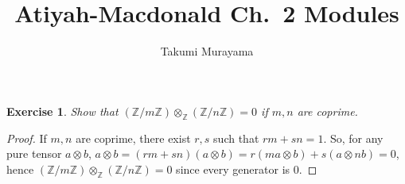 \documentclass[12pt,letterpaper]{article}
\title{Atiyah-Macdonald Ch.~2 Modules}
\author{Takumi Murayama}
\newtheorem{problem}{Exercise}[section]
\theoremstyle{definition}
\theoremstyle{remark}
\newtheorem*{remark}{Remark}
\numberwithin{figure}{problem}
\numberwithin{equation}{section}
\begin{document}
\maketitle \setcounter{section}{2}
\begin{problem}
  Show that
  $(\mathbb{Z}/m\mathbb{Z}) \otimes_{\mathbb{Z}} (\mathbb{Z}/n\mathbb{Z}) =
  0$ if
  $m,n$ are coprime.
\end{problem}
%
\begin{proof}
  If
  $m,n$ are coprime, there exist
  $r,s$ such that
  $rm + sn =
  1$.
  So, for any pure tensor
  $a \otimes
  b$,
  $a \otimes b = (rm + sn)(a \otimes b) = r(ma \otimes b) + s(a \otimes nb) =
  0$, hence
  $(\mathbb{Z}/m\mathbb{Z}) \otimes_{\mathbb{Z}} (\mathbb{Z}/n\mathbb{Z}) =
  0$ since every generator is
  $0$.
\end{proof}
\end{document}
